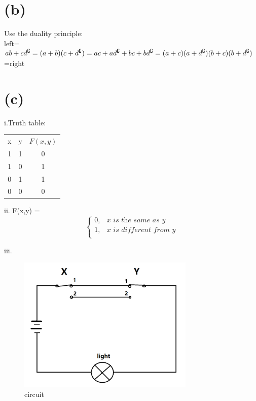 \documentclass{article}
\begin{document}
\section*{(b)}
Use the duality principle:\\
left=\(ab+cd^\complement=(a+b)(c+d^\complement)=ac+ad^\complement+bc+bd^\complement\\=(a+c)(a+d^\complement)(b+c)(b+d^\complement)\)=right
\section*{(c)}
i.Truth table:\\
\begin{center}
\begin{tabular}{ c c c }
 x & y & \(F(x,y)\) \\ 
 1 & 1 & 0 \\  
 1 & 0 & 1 \\
 0 & 1 & 1 \\
 0 & 0 & 0 \\    
\end{tabular}
\end{center}

ii.
F(x,y) = 
\[ 
\begin{cases} 
      0, & \textit{x is the same as y} \\
      1, & \textit{x is different from y}\\ 
   \end{cases}
\]

iii.
\begin{figure}[h]
    \centering
    \includegraphics[width=0.75\textwidth]{Q5}
    \caption{circuit}
    \label{fig:1}
\end{figure}
\end{document}
